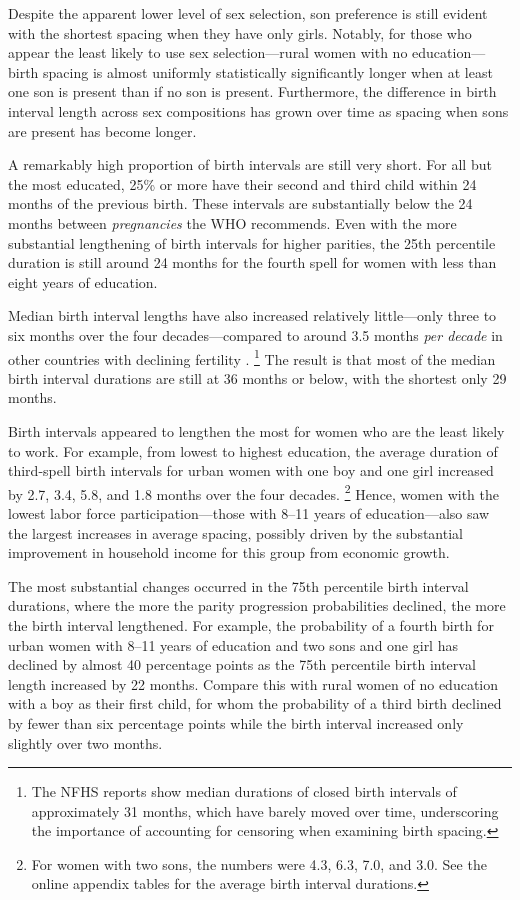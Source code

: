 \documentclass[12pt,letterpaper]{article}
\begin{document}
Despite the apparent lower level of sex selection, son preference is still evident with 
the shortest spacing when they have only girls. 
Notably, for those who appear the least likely to use sex selection---rural women with no
education---birth spacing is almost uniformly statistically significantly longer when at
least one son is present than if no son is present. 
Furthermore, the difference in birth interval length across sex compositions has grown over
time as spacing when sons are present has become longer.

A remarkably high proportion of birth intervals are still very short.
For all but the most educated, 25\% or more have their second and third child 
within 24 months of the previous birth.
These intervals are substantially below the 24 months between 
\emph{pregnancies} the WHO recommends.
Even with the more substantial lengthening of birth intervals for higher parities, the 25th
percentile duration is still around 24 months for the fourth spell for women with less than
eight years of education.

Median birth interval lengths have also increased relatively little---only three to six months 
over the four decades---compared to around 3.5 months \emph{per decade} in other countries with 
declining fertility \citep{Rutstein2011,Casterline2016}.%
\footnote{
The NFHS reports show median durations of closed birth intervals of approximately 31 months, 
which have barely moved over time, underscoring the importance of accounting for censoring 
when examining birth spacing.
}
The result is that most of the median birth interval durations are still at 36 months or
below, with the shortest only 29 months.


Birth intervals appeared to lengthen the most for women who are the least likely to work.
For example, from lowest to highest education, the average duration of third-spell birth 
intervals for urban women with one boy and one girl increased by 2.7, 3.4, 5.8, and 1.8 
months over the four decades.%
\footnote{
For women with two sons, the numbers were 4.3, 6.3, 7.0, and 3.0.
See the online appendix tables for the average birth interval durations.
}
Hence, women with the lowest labor force participation---those with 8--11 years 
of education---also saw the largest increases in average spacing, possibly driven by the 
substantial improvement in household income for this group from economic growth.


The most substantial changes occurred in the 75th percentile birth interval durations, 
where the more the parity progression probabilities declined, the more the birth interval 
lengthened. 
For example, the probability of a fourth birth for urban women with 8--11 years 
of education and two sons and one girl has declined by almost 40 percentage points as the 
75th percentile birth interval length increased by 22 months.
Compare this with rural women of no education with a boy as their first child, for whom the 
probability of a third birth declined by fewer than six percentage points while the birth 
interval increased only slightly over two months.
\end{document}
